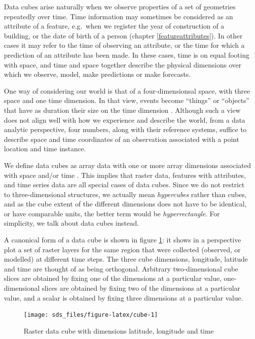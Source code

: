 \documentclass[]{book}
\begin{document}
Data cubes arise naturally when we observe properties of a set of
geometries repeatedly over time. Time information may sometimes be
considered as an attribute of a feature, e.g.~when we register the year
of construction of a building, or the date of birth of a person (chapter
\ref{featureattributes}). In other cases it may refer to the time
of observing an attribute, or the time for which a prediction of an
attribute has been made. In these cases, time is on equal footing
with space, and time and space together describe the physical
dimensions over which we observe, model, make predictions or make
forecasts.

One way of considering our world is that of a four-dimensionsal
space, with three space and one time dimension. In that view,
events become ``things'' or ``objects'' that have as duration their
size on the time dimension \citep{galton}. Although such a view does
not align well with how we experience and describe the world,
from a data analytic perspective, four numbers, along with their
reference systems, suffice to describe space and time coordinates
of an observation associated with a point location and time instance.

We define data cubes as array data with one or more array dimensions
associated with space and/or time \citep{lu2018multidimensional}. This
implies that raster data, features with attributes, and time series
data are all special cases of data cubes. Since we do not restrict
to three-dimensional structures, we actually mean \emph{hypercubes}
rather than cubes, and as the cube extent of the different dimensions
does not have to be identical, or have comparable units, the better
term would be \emph{hyperrectangle}. For simplicity, we talk about data
cubes instead.

A canonical form of a data cube is shown in figure \ref{fig:cube}:
it shows in a perspective plot a set of raster layers for the same
region that were collected (observed, or modelled) at different time
steps. The three cube dimensions, longitude, latitude and time are
thought of as being orthogonal. Arbitrary two-dimensional cube
slices are obtained by fixing one of the dimensions at a particular
value, one-dimensional slices are obtained by fixing two of the
dimensions at a particular value, and a scalar is obtained by fixing
three dimensions at a particular value.

\begin{figure}

{\centering \texttt{[image: sds\_files/figure-latex/cube-1]} 

}

\caption{Raster data cube with dimensions latitude, longitude and time}\label{fig:cube}
\end{figure}
\end{document}

